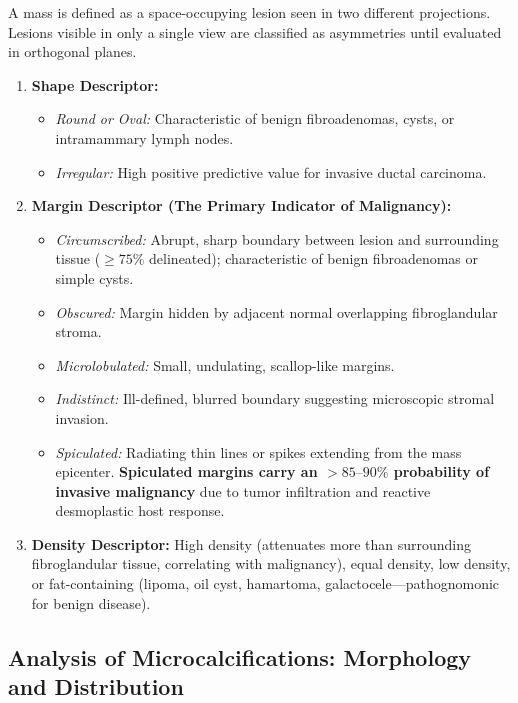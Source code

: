 \documentclass[11pt,a4paper]{article}
\begin{document}
A mass is defined as a space-occupying lesion seen in two different projections. Lesions visible in only a single view are classified as asymmetries until evaluated in orthogonal planes.

\begin{enumerate}[leftmargin=*]
    \item \textbf{Shape Descriptor:}
    \begin{itemize}
        \item \textit{Round or Oval:} Characteristic of benign fibroadenomas, cysts, or intramammary lymph nodes.
        \item \textit{Irregular:} High positive predictive value for invasive ductal carcinoma.
    \end{itemize}
    \item \textbf{Margin Descriptor (The Primary Indicator of Malignancy):}
    \begin{itemize}
        \item \textit{Circumscribed:} Abrupt, sharp boundary between lesion and surrounding tissue ($\ge 75\%$ delineated); characteristic of benign fibroadenomas or simple cysts.
        \item \textit{Obscured:} Margin hidden by adjacent normal overlapping fibroglandular stroma.
        \item \textit{Microlobulated:} Small, undulating, scallop-like margins.
        \item \textit{Indistinct:} Ill-defined, blurred boundary suggesting microscopic stromal invasion.
        \item \textit{Spiculated:} Radiating thin lines or spikes extending from the mass epicenter. \textbf{Spiculated margins carry an $> 85\text{--}90\%$ probability of invasive malignancy} due to tumor infiltration and reactive desmoplastic host response.
    \end{itemize}
    \item \textbf{Density Descriptor:} High density (attenuates more than surrounding fibroglandular tissue, correlating with malignancy), equal density, low density, or fat-containing (lipoma, oil cyst, hamartoma, galactocele—pathognomonic for benign disease).
\end{enumerate}

\subsection{Analysis of Microcalcifications: Morphology and Distribution}
\end{document}
